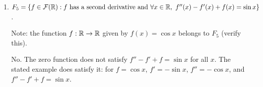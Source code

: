 \begin{enumerate}[label=\alph*)]
\begin{answer}
Yes. Put $L(f)=f''-3f'+2f$. For twice differentiable $f,g$,
$L(\alpha f+\beta g)=\alpha L(f)+\beta L(g)$, and $L(0)=0$.
Therefore the solutions of $L(f)=0$ form a subspace.
For the additional check, if $f=ae^x+be^{2x}$, then
\[
 f'=ae^x+2be^{2x},\qquad f''=ae^x+4be^{2x},
\]
so $f''-3f'+2f=(1-3+2)ae^x+(4-6+2)be^{2x}=0$.
\end{answer}

\item $F_5=\{f\in\mathcal F(\RR):f\text{ has a second derivative and }\forall x\in\RR,\ f^{\prime\prime}(x)-f^{\prime}(x)+f(x)=\sin x\}$.

Note: the function $f:\mathbb R\to\mathbb R$ given by $f(x)=\cos x$ belongs to $F_5$ (verify this).

\begin{answer}
No. The zero function does not satisfy
$f''-f'+f=\sin x$ for all $x$. The stated example does satisfy it:
for $f=\cos x$, $f'=-\sin x$, $f''=-\cos x$, and
$f''-f'+f=\sin x$.
\end{answer}
\end{enumerate}
